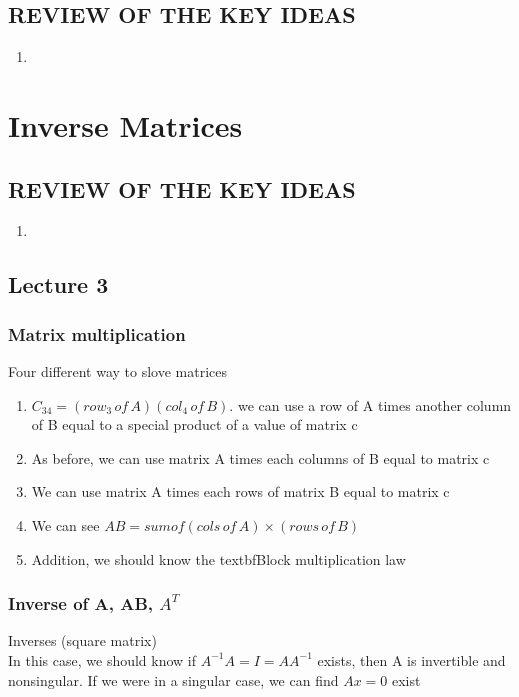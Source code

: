 \documentclass{book}
\begin{document}
    \subsection*{REVIEW OF THE KEY IDEAS}
        \begin{enumerate}
            \item  
        \end{enumerate}

\section{Inverse Matrices}
    \subsection*{REVIEW OF THE KEY IDEAS}
        \begin{enumerate}
            \item  
        \end{enumerate}
    
    \subsection*{Lecture 3}
    \subsubsection{Matrix multiplication}
    Four different way to slove matrices
        \begin{enumerate}
            \item \( C_{34} = (row_3 \,of\, A)(col_4\, of\, B) \). we can use a row of A times another column of B equal to a special product of a value of matrix c
            \item As before, we can use matrix A times each columns of B equal to matrix c
            \item We can use matrix A times each rows of matrix B equal to matrix c
            \item We can see \( AB = sum of (cols\, of\, A) \times (rows\, of\, B)\)
            \item Addition, we should know the textbf{Block multiplication} law
        \end{enumerate}
    \subsubsection{Inverse of A, AB, \( A^T\)}
    Inverses (square matrix) \\
    In this case, we should know if \( A^{-1}A = I = A A^{-1}\) exists, then A is invertible and nonsingular. If we were in a singular case, we can find \( A x = 0\) exist
\end{document}
